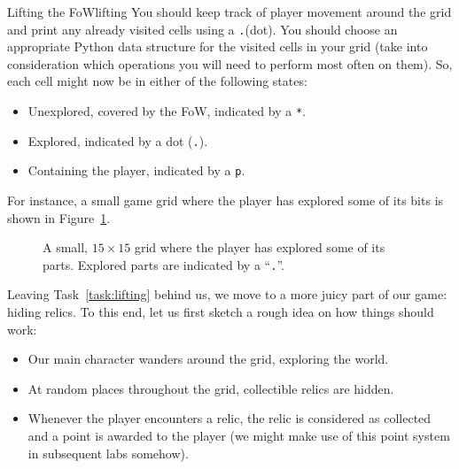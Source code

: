\documentclass[a4paper, 11pt]{article}
\numberwithin{equation}{section}
\theoremstyle{definition}
\newcommand{\player}{\texttt{p}}
\newcommand{\fow}{\texttt{*}}
\newcommand{\visited}{\texttt{.}}
\begin{document}
	\begin{task}{Lifting the FoW}{lifting}
		You should keep track of player movement around the grid and print any already visited cells using a \visited (dot). You should choose an appropriate Python data structure for the visited cells in your grid (take into consideration which operations you will need to perform most often on them). So, each cell might now be in either of the following states:
		\begin{itemize}
			\item Unexplored, covered by the FoW, indicated by a \fow.
			\item Explored, indicated by a dot (\visited).
			\item Containing the player, indicated by a \player.
		\end{itemize}
		For instance, a small game grid where the player has explored some of its bits is shown in Figure~\ref{fig:explored grid}.
	\end{task}
	
	\begin{figure}[!tb]
		\centering
		\caption{A small, $15\times 15$ grid where the player has explored some of its parts. Explored parts are indicated by a ``\visited''.}
		\label{fig:explored grid}
	\end{figure}
	
	Leaving Task~\ref{task:lifting} behind us, we move to a more juicy part of our game: hiding relics. To this end, let us first sketch a rough idea on how things should work:
	\begin{itemize}
		\item Our main character wanders around the grid, exploring the world.
		\item At random places throughout the grid, collectible relics are hidden.
		\item Whenever the player encounters a relic, the relic is considered as collected and a point is awarded to the player (we might make use of this point system in subsequent labs somehow).
	\end{itemize}
	
\end{document}
